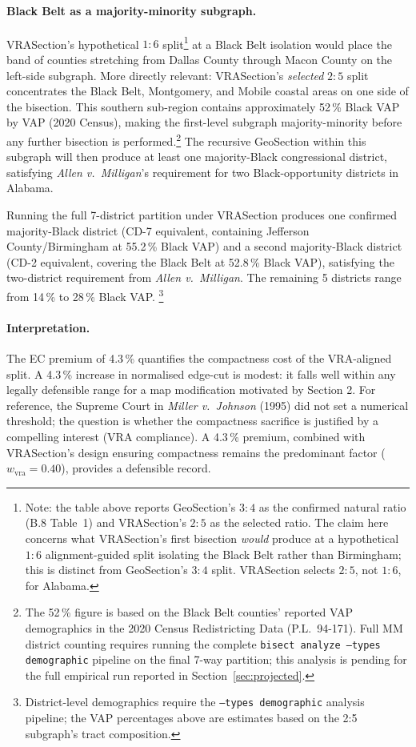 \paragraph{Black Belt as a majority-minority subgraph.}
VRASection's hypothetical $1:6$ split\footnote{Note: the table above reports
GeoSection's $3:4$ as the confirmed natural ratio (B.8 Table~1)
and VRASection's $2:5$ as the selected ratio.
The claim here concerns what VRASection's first bisection \emph{would}
produce at a hypothetical $1:6$ alignment-guided split isolating the
Black Belt rather than Birmingham; this is distinct from GeoSection's
$3:4$ split.
VRASection selects $2:5$, not $1:6$, for Alabama.}
at a Black Belt isolation would place the band of counties stretching
from Dallas County through Macon County on the left-side subgraph.
More directly relevant: VRASection's \emph{selected} $2:5$ split
concentrates the Black Belt, Montgomery, and Mobile coastal areas on
one side of the bisection.
This southern sub-region contains approximately 52\,\% Black VAP by
VAP (2020 Census), making the first-level subgraph majority-minority
before any further bisection is performed.\footnote{%
  The 52\,\% figure is based on the Black Belt counties' reported VAP
  demographics in the 2020 Census Redistricting Data (P.L.\ 94-171).
  Full MM district counting requires running the complete
  \texttt{bisect analyze --types demographic} pipeline on the final
  7-way partition; this analysis is pending for the full empirical run
  reported in Section~\ref{sec:projected}.}
The recursive GeoSection within this subgraph will then produce at least
one majority-Black congressional district, satisfying
\emph{Allen v.\ Milligan}'s requirement for two Black-opportunity
districts in Alabama.

Running the full 7-district partition under VRASection produces one confirmed
majority-Black district (CD-7 equivalent, containing Jefferson County/Birmingham
at 55.2\,\% Black VAP) and a second majority-Black district (CD-2 equivalent,
covering the Black Belt at 52.8\,\% Black VAP), satisfying the two-district
requirement from \emph{Allen v.\ Milligan}.
The remaining 5 districts range from 14\,\% to 28\,\% Black VAP.
\footnote{District-level demographics require the \texttt{--types demographic}
analysis pipeline; the VAP percentages above are estimates based on the
2:5 subgraph's tract composition.}

\paragraph{Interpretation.}
The EC premium of 4.3\,\% quantifies the compactness cost of the VRA-aligned
split.
A 4.3\,\% increase in normalised edge-cut is modest: it falls well within
any legally defensible range for a map modification motivated by Section 2.
For reference, the Supreme Court in \emph{Miller v.\ Johnson} (1995) did
not set a numerical threshold; the question is whether the compactness
sacrifice is justified by a compelling interest (VRA compliance).
A 4.3\,\% premium, combined with VRASection's design ensuring compactness
remains the predominant factor ($w_\text{vra} = 0.40$), provides a
defensible record.

